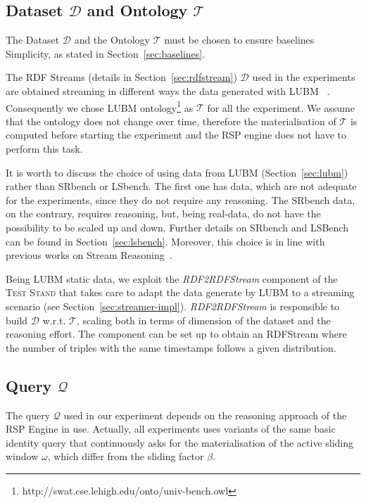 \subsection{Dataset $\mathcal{D}$ and Ontology $\mathcal{T}$}\label{sec:dataset}

\noindent The Dataset  $\mathcal{D}$ and the Ontology $\mathcal{T}$ must be chosen to ensure baselines Simplicity, as stated in Section~\ref{sec:baselines}. 

The RDF Streams (details in Section~\ref{sec:rdfstream}) $\mathcal{D}$ used in the experiments are obtained streaming in different ways the data generated with LUBM ~\cite{Guo2005}. Consequently we chose LUBM ontology\footnote{http://swat.cse.lehigh.edu/onto/univ-bench.owl} as $\mathcal{T}$ for all the experiment. We assume that the ontology does not change over time, therefore the materialisation of $\mathcal{T}$ is computed before starting the experiment and the RSP engine does not have to perform this task. 

It is worth to discuss the choice of using data from LUBM (Section~\ref{sec:lubm}) rather than SRbench or LSbench. The first one has data, which are not adequate for the experiments, since they do not require any reasoning. The SRbench data, on the contrary, requires reasoning, but, being real-data, do not have the possibility to be scaled up and down. Further details on SRbench and LSBench can be found in Section~\ref{sec:lsbench}. Moreover, this choice is in line with previous works on Stream Reasoning~\cite{DBLP:conf/semweb/UrbaniMJHB13}. 

Being LUBM static data, we exploit the \textit{RDF2RDFStream} component of the \textsc{Test Stand} that takes care to adapt the data generate by LUBM to a streaming scenario (see Section~\ref{sec:streamer-impl}). \textit{RDF2RDFStream} is responsible to build $\mathcal{D}$ w.r.t. $\mathcal{T}$, scaling both in terms of dimension of the dataset and the reasoning effort. The component can be set up to obtain an RDFStream where the number of triples with the same timestamps follows a given distribution. %

\subsection{Query $\mathcal{Q}$}\label{sec:query}
 
The query $\mathcal{Q}$ used in our experiment depends on the reasoning approach of the RSP Engine in use. Actually, all  experiments uses variants of the same basic identity query that continuously asks for the materialisation of the active sliding window $\omega$, which differ from the sliding factor $\beta$.\\

